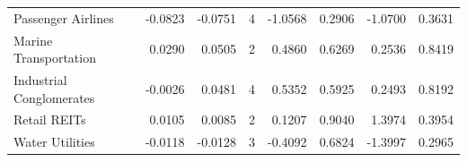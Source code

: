 \begin{table}
\begin{tabular}{lrrrrrrr}
Passenger Airlines & -0.0823 & -0.0751 & 4 & -1.0568 & 0.2906 & -1.0700 & 0.3631 \\
Marine Transportation & 0.0290 & 0.0505 & 2 & 0.4860 & 0.6269 & 0.2536 & 0.8419 \\
Industrial Conglomerates & -0.0026 & 0.0481 & 4 & 0.5352 & 0.5925 & 0.2493 & 0.8192 \\
Retail REITs & 0.0105 & 0.0085 & 2 & 0.1207 & 0.9040 & 1.3974 & 0.3954 \\
Water Utilities & -0.0118 & -0.0128 & 3 & -0.4092 & 0.6824 & -1.3997 & 0.2965 \\
\bottomrule
\end{tabular}
\end{table}
